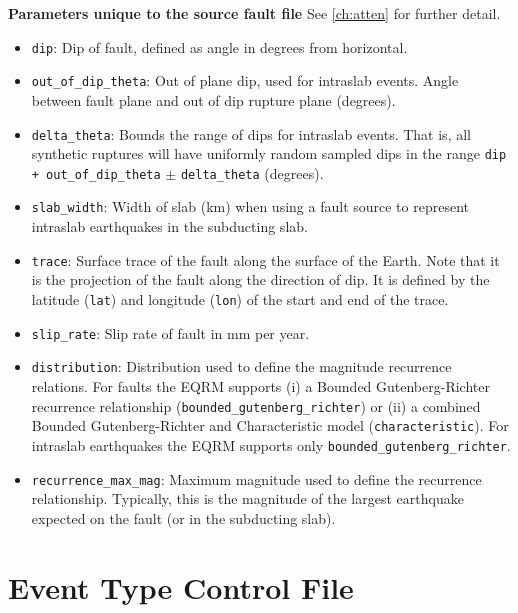 \textbf{Parameters unique to the source fault file}
See \cref{ch:atten} for further detail.
\begin{itemize}
\item \texttt{dip}: Dip of fault, defined as angle in degrees from
  horizontal.

\item \texttt{out\_of\_dip\_theta}: Out of plane dip, used for
  intraslab events. Angle between fault plane and out of dip rupture
  plane (degrees).

\item \texttt{delta\_theta}: Bounds the range of dips for intraslab
  events. That is, all synthetic ruptures will have uniformly random
  sampled dips in the range \texttt{dip + out\_of\_dip\_theta} $\pm$
  \texttt{delta\_theta} (degrees).

\item \texttt{slab\_width}: Width of slab (km) when using a fault
  source to represent intraslab earthquakes in the subducting slab.

\item \texttt{trace}: Surface trace of the fault along the surface
of the Earth. Note that it is the projection of the fault along the
direction of dip. It is defined by the latitude (\texttt{lat}) and
longitude (\texttt{lon}) of the start and end of the trace.
\item \texttt{slip\_rate}: Slip rate of fault in mm per year.

\item \texttt{distribution}: Distribution used to define the magnitude
  recurrence relations.  For faults the EQRM supports (i) a Bounded
  Gutenberg-Richter recurrence relationship
  (\texttt{bounded}\texttt{\_gutenberg}\texttt{\_richter}) or (ii) a
  combined Bounded Gutenberg-Richter and Characteristic model
  (\texttt{characteristic}). For intraslab earthquakes the EQRM
  supports only
  \texttt{bounded}\texttt{\_gutenberg}\texttt{\_richter}.

\item \texttt{recurrence\_max\_mag}: Maximum magnitude used to
define the recurrence relationship. Typically, this is the magnitude
of the largest earthquake expected on the fault (or in the
subducting slab).
\end{itemize}

\section{Event Type Control File}
\label{sec:event-type-control_file}



